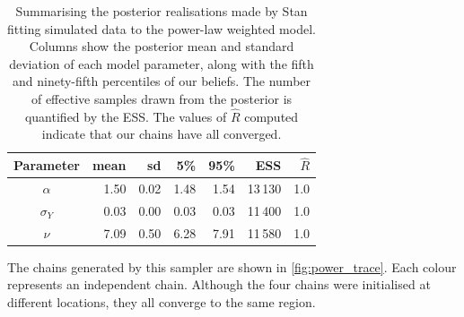 \begin{table}[tbp]
  \begin{tabular}{@{}crrrrrr@{}}
    \toprule
    Parameter    & mean & sd   & 5\%  & 95\% & ESS     & $\widehat{R}$ \\
    \midrule
    $\alpha$     & 1.50 & 0.02 & 1.48 & 1.54 & 13\,130 & 1.0           \\
    $\sigma_{Y}$ & 0.03 & 0.00 & 0.03 & 0.03 & 11\,400 & 1.0           \\
    $\nu$        & 7.09 & 0.50 & 6.28 & 7.91 & 11\,580 & 1.0           \\
    \bottomrule
  \end{tabular}
  \caption{Summarising the posterior realisations made by Stan fitting
    simulated data to the power-law weighted model. Columns show the
    posterior mean and standard deviation of each model parameter, along with
    the fifth and ninety-fifth percentiles of our beliefs. The number of
    effective samples drawn from the posterior is quantified by the ESS. The
    values of $\widehat{R}$ computed indicate that our chains have all
    converged.}
  \label{tab:power_summary}
\end{table}

The chains generated by this sampler are shown in \cref{fig:power_trace}. Each
colour represents an independent chain. Although the four chains were
initialised at different locations, they all converge to the same region.

